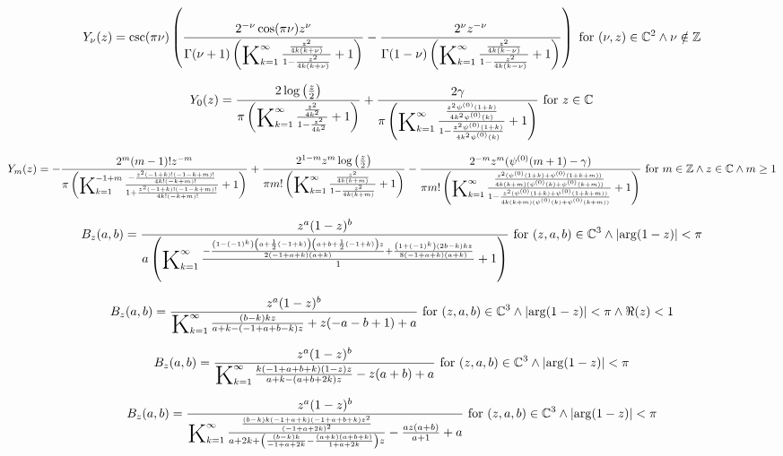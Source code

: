 \documentclass{article}
\newcommand{\bigK}{\mathop{\raisebox{-5pt}{\huge K}}}
\begin{document}
\[Y_{\nu }(z)=\csc (\pi  \nu ) \left(\frac{2^{-\nu } \cos (\pi  \nu ) z^{\nu }}{\Gamma (\nu +1) \left(\bigK_{k=1}^{\infty}\frac{\frac{z^2}{4 k (k+\nu )}}{1-\frac{z^2}{4 k (k+\nu )}}+1\right)}-\frac{2^{\nu } z^{-\nu }}{\Gamma (1-\nu ) \left(\bigK_{k=1}^{\infty}\frac{\frac{z^2}{4 k (k-\nu )}}{1-\frac{z^2}{4 k (k-\nu )}}+1\right)}\right)\text{ for }(\nu ,z)\in \mathbb{C}^2\land \nu \notin \mathbb{Z}\] 

\[Y_0(z)=\frac{2 \log \left(\frac{z}{2}\right)}{\pi  \left(\bigK_{k=1}^{\infty}\frac{\frac{z^2}{4 k^2}}{1-\frac{z^2}{4 k^2}}+1\right)}+\frac{2 \gamma }{\pi  \left(\bigK_{k=1}^{\infty}\frac{\frac{z^2 \psi ^{(0)}(1+k)}{4 k^2 \psi ^{(0)}(k)}}{1-\frac{z^2 \psi ^{(0)}(1+k)}{4 k^2 \psi ^{(0)}(k)}}+1\right)}\text{ for }z\in \mathbb{C}\] 

\[Y_m(z)=-\frac{2^m (m-1)! z^{-m}}{\pi  \left(\bigK_{k=1}^{-1+m}\frac{-\frac{z^2 (-1+k)! (-1-k+m)!}{4 k! (-k+m)!}}{1+\frac{z^2 (-1+k)! (-1-k+m)!}{4 k! (-k+m)!}}+1\right)}+\frac{2^{1-m} z^m \log \left(\frac{z}{2}\right)}{\pi  m! \left(\bigK_{k=1}^{\infty}\frac{\frac{z^2}{4 k (k+m)}}{1-\frac{z^2}{4 k (k+m)}}+1\right)}-\frac{2^{-m} z^m (\psi ^{(0)}(m+1)-\gamma )}{\pi  m! \left(\bigK_{k=1}^{\infty}\frac{\frac{z^2 (\psi ^{(0)}(1+k)+\psi ^{(0)}(1+k+m))}{4 k (k+m) (\psi ^{(0)}(k)+\psi ^{(0)}(k+m))}}{1-\frac{z^2 (\psi ^{(0)}(1+k)+\psi ^{(0)}(1+k+m))}{4 k (k+m) (\psi ^{(0)}(k)+\psi ^{(0)}(k+m))}}+1\right)}\text{ for }m\in \mathbb{Z}\land z\in \mathbb{C}\land m\geq 1\] 

\[B_z(a,b)=\frac{z^a (1-z)^b}{a \left(\bigK_{k=1}^{\infty}\frac{-\frac{\left(1-(-1)^k\right) \left(a+\frac{1}{2} (-1+k)\right) \left(a+b+\frac{1}{2} (-1+k)\right) z}{2 (-1+a+k) (a+k)}+\frac{\left(1+(-1)^k\right) (2 b-k) k z}{8 (-1+a+k) (a+k)}}{1}+1\right)}\text{ for }(z,a,b)\in \mathbb{C}^3\land \left| \arg (1-z)\right| <\pi\] 

\[B_z(a,b)=\frac{z^a (1-z)^b}{\bigK_{k=1}^{\infty}\frac{(b-k) k z}{a+k-(-1+a+b-k) z}+z (-a-b+1)+a}\text{ for }(z,a,b)\in \mathbb{C}^3\land \left| \arg (1-z)\right| <\pi \land \Re(z)<1\] 

\[B_z(a,b)=\frac{z^a (1-z)^b}{\bigK_{k=1}^{\infty}\frac{k (-1+a+b+k) (1-z) z}{a+k-(a+b+2 k) z}-z (a+b)+a}\text{ for }(z,a,b)\in \mathbb{C}^3\land \left| \arg (1-z)\right| <\pi\] 

\[B_z(a,b)=\frac{z^a (1-z)^b}{\bigK_{k=1}^{\infty}\frac{\frac{(b-k) k (-1+a+k) (-1+a+b+k) z^2}{(-1+a+2 k)^2}}{a+2 k+\left(\frac{(b-k) k}{-1+a+2 k}-\frac{(a+k) (a+b+k)}{1+a+2 k}\right) z}-\frac{a z (a+b)}{a+1}+a}\text{ for }(z,a,b)\in \mathbb{C}^3\land \left| \arg (1-z)\right| <\pi\] 
\end{document}
